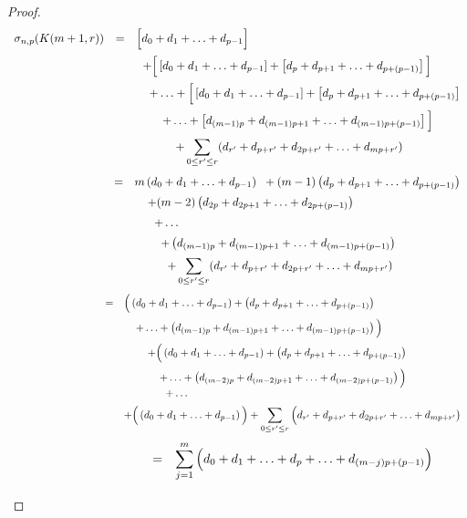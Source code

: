 \documentclass[11pt,a4paper,times]{amsart}
\theoremstyle{plain}
\theoremstyle{definition}
\numberwithin{equation}{section}
\newcommand{\ds}{\displaystyle}
\newcommand{\dsum}{\ds\sum}
\newcommand{\eqskip}{ \vspace*{2mm}\\ }
\begin{document}
{\begin{proof}
\[
\begin{array}{lll}
\sigma_{n,p}(K(m+1,r))&=& \Big{[}d_0+ d_1+\ldots+ d_{p-1}\Big{]}\eqskip
&&\hspace*{2mm} + \Big{[}   \left[d_0+ d_1+\ldots+ d_{p-1}\right]+
\left[d_p+ d_{p+1}+\ldots+ d_{p+ (p-1)}\right]\Big{]}\eqskip
&& \hspace*{4mm} + \ldots+ \Big{[} \left[d_0+ d_1+\ldots+ d_{p-1}\right]+
\left[d_p+ d_{p+1}+\ldots+ d_{p+ (p-1)}\right]\eqskip
&&\hspace*{8mm}
+ \ldots+\left[d_{(m-1)p}+ d_{(m-1)p+1}+\ldots+ d_{(m-1)p+ (p-1)}\right] \Big{]}\eqskip
&& \hspace*{12mm}+
\dsum_{0\leq r'\leq r} (d_{r'}+ d_{p+r'}+ d_{2p+r'}+\ldots+d_{mp+r'})
\end{array}
\]
\[
\begin{array}{lll}
\phantom{\sigma_{n,p}(K(m+1,r))}
&=& m \left(d_0+ d_1+\ldots+ d_{p-1}\right)
\hspace*{2mm}+ (m-1) \left(d_{p}+ d_{p+1}+\ldots+ d_{p+ (p-1)}\right) \eqskip
&& \hspace*{4mm}+(m-2)\left(d_{2p}+ d_{2p+1}+\ldots+ d_{2p+ (p-1)}\right)\eqskip
&& \hspace*{6mm}+\ldots\eqskip
&& \hspace*{8mm}+ \left(d_{(m-1)p}+ d_{(m-1)p+1}+\ldots+ d_{(m-1)p+ (p-1)}\right)\eqskip
&& \hspace*{10mm}+ \dsum_{0\leq r'\leq r} (d_{r'}+ d_{p+r'}+ d_{2p+r'}+\ldots+d_{mp+r'})
\end{array}
\]
\[
\begin{array}{lll}
\phantom{\sigma_{n,p}(K(m+1,r))}
&=&  \Big{(}\left(d_0+d_1+\ldots+d_{p-1}\right) +\left(d_p+d_{p+1}+\ldots+d_{p+ (p-1)}\right)\eqskip
&&\hspace*{4mm} +\ldots+
\left(d_{(m-1)p}+d_{(m-1)p+1}+\ldots+d_{(m-1)p+(p-1)}\right)\Big{)}\eqskip
&&\hspace*{8mm}+  \Big{(} \left(d_0+d_1+\ldots+d_{p-1}\right)
+\left(d_p+d_{p+1}+\ldots +d_{p+ (p-1)}\right)\eqskip
&& \hspace*{12mm}+\ldots+\left(d_{(m-2)p}+d_{(m-2)p+1}+\ldots+d_{(m-2)p+(p-1)}\right)\Big{)}\\
&& \hspace*{14mm}+\ldots\eqskip
&& +  \Big{(} \left(d_0+d_1+\ldots+d_{p-1}\right)\Big{)}
+ \dsum_{0\leq r'\leq r} \Big{(}d_{r'}+ d_{p+r'}+ d_{2p+r'}+\ldots+d_{mp+r'}\big{)}
\end{array}
\]
\[
\begin{array}{lll}
\phantom{\sigma_{n,p}(K(m+1,r))}
& = & \dsum_{j=1}^m  \Big{(} d_0+d_1+\ldots +d_p +\ldots +  d_{(m-j)p+(p-1)}\Big{)}\eqskip

\end{array}\]
\end{proof}}
\end{document}
